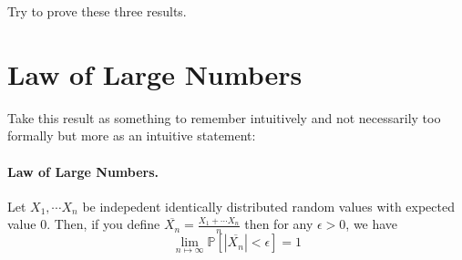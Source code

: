\documentclass[12pt]{article}
\newcommand{\PP}{\mathbb{P}}
\begin{document}
Try to prove these three results.
\eject
\section*{Law of Large Numbers}

Take this result as something to remember intuitively and not necessarily too formally but more as an intuitive statement:

\paragraph*{\textbf{Law of Large Numbers.}} Let $X_1,\cdots X_n$ be indepedent identically distributed random values with expected value $0$. Then, if you define $\overline{X_n}=\frac{X_1+\cdots X_n}{n}$ then for any $\epsilon>0$, we have \[\lim_{n\mapsto \infty} \PP[|\overline{X_n}|<\epsilon]=1\]
\end{document}
